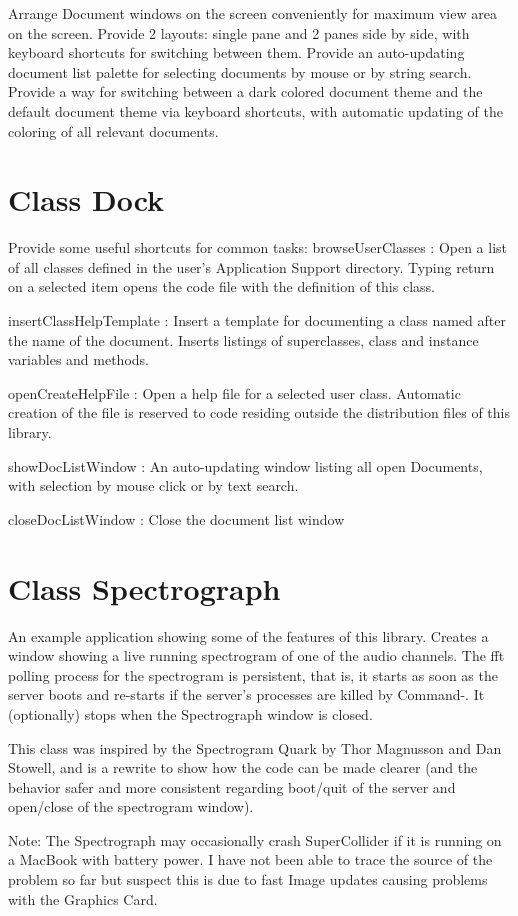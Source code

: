 \documentclass[11pt]{article}
\begin{document}
Arrange Document windows on the screen conveniently for maximum view area on the screen. Provide 2 layouts: single pane and 2 panes side by side, with keyboard shortcuts for switching between them. Provide an auto-updating document list palette for selecting documents by mouse or by string search. Provide a way for switching between a dark colored document theme and the default document theme via keyboard shortcuts, with automatic updating of the coloring of all relevant documents. 
\section{Class Dock}
\label{sec-8}


Provide some useful shortcuts for common tasks: 
   browseUserClasses :    Open a list of all classes defined in the user's Application Support 
      directory. Typing return on a selected item opens the code file with the definition of this class. 

   insertClassHelpTemplate : Insert a template for documenting a class named after the name of the
      document. Inserts listings of superclasses, class and instance variables and methods. 

   openCreateHelpFile : Open a help file for a selected user class. Automatic creation of the file 
         is reserved to code residing outside the distribution files of this library. 

   showDocListWindow :  An auto-updating window listing all open Documents, with selection by mouse click
               or by text search.

   closeDocListWindow : Close the document list window
\section{Class Spectrograph}
\label{sec-9}


An example application showing some of the features of this library. Creates a window showing a live running spectrogram of one of the audio channels. The fft polling process for the spectrogram is persistent, that is, it starts as soon as the server boots and re-starts if the server's processes are killed by Command-. It (optionally) stops when the Spectrograph window is closed. 

This class was inspired by the Spectrogram Quark by Thor Magnusson and Dan Stowell, and is a rewrite to show how the code can be made clearer (and the behavior safer and more consistent regarding boot/quit of the server and open/close of the spectrogram window). 

Note: The Spectrograph may occasionally crash SuperCollider if it is running on a MacBook with battery power. I have not been able to trace the source of the problem so far but suspect this is due to fast Image updates causing problems with the Graphics Card.
\end{document}
